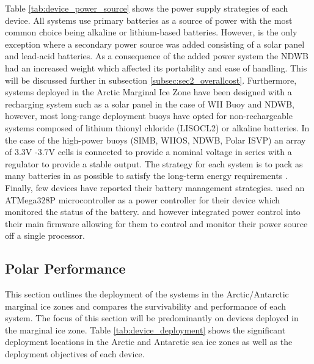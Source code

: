 Table \ref{tab:device_power_source} shows the power supply strategies of each device. All systems use primary batteries as a source of power with the most common choice being alkaline or lithium-based batteries. However, \textcite{doble2017robust} is the only exception where a secondary power source was added consisting of a solar panel and lead-acid batteries. As a consequence of the added power system the NDWB had an increased weight which affected its portability and ease of handling. This will be discussed further in subsection \ref{subsec:sec2_overallcost}. Furthermore, systems deployed in the Arctic Marginal Ice Zone have been designed with a recharging system such as a solar panel in the case of WII Buoy and NDWB, however, most long-range deployment buoys have opted for non-rechargeable systems composed of lithium thionyl chloride (LISOCL2) or alkaline batteries. In the case of the high-power buoys (SIMB, WIIOS, NDWB, Polar ISVP) an array of 3.3V -3.7V cells is connected to provide a nominal voltage in series with a regulator to provide a stable output. The strategy for each system is to pack as many batteries in as possible to satisfy the long-term energy requirements \cite{doble2017robust,rabault2019open}. Finally, few devices have reported their battery management strategies. \textcite{rabault2019open} used an ATMega328P microcontroller as a power controller for their device which monitored the status of the battery. \textcite{trident} and \textcite{kohout2015device} however integrated power control into their main firmware allowing for them to control and monitor their power source off a single processor.

\subsection{Polar Performance}

This section outlines the deployment of the systems in the Arctic/Antarctic marginal ice zones and compares the survivability and performance of each system. The focus of this section will be predominantly on devices deployed in the marginal ice zone. Table \ref{tab:device_deployment} shows the significant deployment locations in the Arctic and Antarctic sea ice zones as well as the deployment objectives of each device. 

